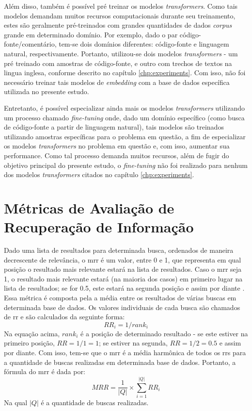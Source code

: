 Além disso, também é possível pré treinar os modelos \textit{transformers}. Como tais modelos demandam muitos recursos computacionais durante seu treinamento, estes são geralmente pré-treinados com grandes quantidades de dados \textit{corpus} grande em determinado domínio. Por exemplo, dado o par código-fonte/comentário, tem-se dois domínios diferentes: código-fonte e linguagem natural, respectivamente. Portanto, utilizou-se dois modelos \textit{transformers} - um pré treinado com amostras de código-fonte, e outro com trechos de textos na lingua inglesa, conforme descrito no capítulo \ref{chp:experiments}. Com isso, não foi necessário treinar tais modelos de \textit{embedding} com a base de dados específica utilizada no presente estudo. 

Entretanto, é possível especializar ainda mais os modelos \textit{transformers} utilizando um processo chamado \textit{fine-tuning} onde, dado um domínio específico (como busca de código-fonte a partir de linguagem natural), tais modelos são treinados utilizando amostras específicas para o problema em questão, a fim de especializar os modelos \textit{transformers} no problema em questão e, com isso, aumentar sua performance. Como tal processo demanda muitos recursos, além de fugir do objetivo principal do presente estudo, o \textit{fine-tuning} não foi realizado para nenhum dos modelos \textit{transformers} citados no capítulo \ref{chp:experiments}.

\section{Métricas de Avaliação de Recuperação de Informação}
Dado uma lista de resultados para determinada busca, ordenados de maneira decrescente de relevância, o \gls{mrr} é um valor, entre 0 e 1, que representa em qual posição o resultado mais relevante estará na lista de resultados. Caso o \gls{mrr} seja 1, o resultado mais relevante estará (na maioria dos casos) em primeiro lugar na lista de resultados; se for 0.5, este estará na segunda posição e assim por diante \cite{Craswell2009}. Essa métrica é composta pela a média entre os resultados de várias buscas em determinada base de dados. Os valores individuais de cada busca são chamados de \gls{rr} e são calculados da seguinte forma:
\begin{equation*}
    RR_i=1/rank_i
\end{equation*}
Na equação acima, $rank_i$ é a posição de determinado resultado - se este estiver na primeiro posição, $RR=1/1=1$; se estiver na segunda, $RR=1/2=0.5$ e assim por diante. Com isso, tem-se que o \gls{mrr} é a média harmônica de todos os \glspl{rr} para a quantidade de buscas realizadas em determinada base de dados. Portanto, a fórmula do \gls{mrr} é dada por:
\begin{equation*}
    MRR = \frac{1}{|Q|} \times \sum_{i=1}^{|Q|} RR_i
\end{equation*}
Na qual $|Q|$ é a quantidade de buscas realizadas.

